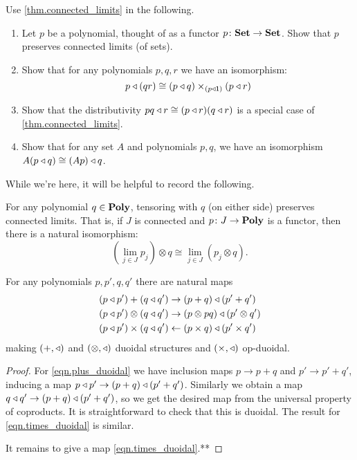\documentclass[DynamicalBook]{subfiles}
\begin{document}
\begin{exercise}\label{ex.connected_limits_and_tri}
Use \cref{thm.connected_limits} in the following.
\begin{enumerate}
	\item Let $p$ be a polynomial, thought of as a functor $p\colon\textbf{Set}\to\textbf{Set}$. Show that $p$ preserves connected limits (of sets).
	\item Show that for any polynomials $p,q,r$ we have an isomorphism:
	\[
	p\mathbin{\triangleleft}(qr)\cong (p\mathbin{\triangleleft} q)\times_{(p\mathbin{\triangleleft}\textsf{1})}(p\mathbin{\triangleleft} r)
	\]
	\item Show that the distributivity $pq\mathbin{\triangleleft} r\cong (p\mathbin{\triangleleft} r)(q\mathbin{\triangleleft} r)$ is a special case of \cref{thm.connected_limits}.
	\item Show that for any set $A$ and polynomials $p,q$, we have an isomorphism $A(p\mathbin{\triangleleft} q)\cong (Ap)\mathbin{\triangleleft} q$.
\qedhere
\end{enumerate}
\end{exercise}

While we're here, it will be helpful to record the following.
\begin{proposition}
For any polynomial $q\in\textbf{Poly}$, tensoring with $q$ (on either side) preserves connected limits. That is, if $J$ is connected and $p\colon J\to\textbf{Poly}$ is a functor, then there is a natural isomorphism:
\[
	\left(\lim_{j\in J} p_j\right)\otimes q\cong
	\lim_{j\in J} (p_j\otimes q).
\]
\end{proposition}


\begin{proposition}
For any polynomials $p,p',q,q'$ there are natural maps
\begin{align}\label{eqn.plus_duoidal}
	(p\mathbin{\triangleleft} p')+(q\mathbin{\triangleleft} q')&\to (p+q)\mathbin{\triangleleft}(p'+q')\\\label{eqn.otimes_duoidal}
	(p\mathbin{\triangleleft} p')\otimes(q\mathbin{\triangleleft} q')&\to(p\otimes pq)\mathbin{\triangleleft}(p'\otimes q')\\\label{eqn.times_duoidal}
	(p\mathbin{\triangleleft} p')\times (q\mathbin{\triangleleft} q')&\leftarrow(p\times q)\mathbin{\triangleleft}(p'\times q')
\end{align}
making $(+,\mathbin{\triangleleft})$ and $(\otimes,\mathbin{\triangleleft})$ duoidal structures and $(\times,\mathbin{\triangleleft})$ op-duoidal.
\end{proposition}
\begin{proof}
For \eqref{eqn.plus_duoidal} we have inclusion maps $p\to p+q$ and $p'\to p'+q'$, inducing a map $p\mathbin{\triangleleft} p'\to(p+q)\mathbin{\triangleleft}(p'+q')$. Similarly we obtain a map $q\mathbin{\triangleleft} q'\to(p+q)\mathbin{\triangleleft}(p'+q')$, so we get the desired map from the universal property of coproducts. It is straightforward to check that this is duoidal. The result for \eqref{eqn.times_duoidal} is similar. 

It remains to give a map \eqref{eqn.times_duoidal}.**
\end{proof}
\end{document}

